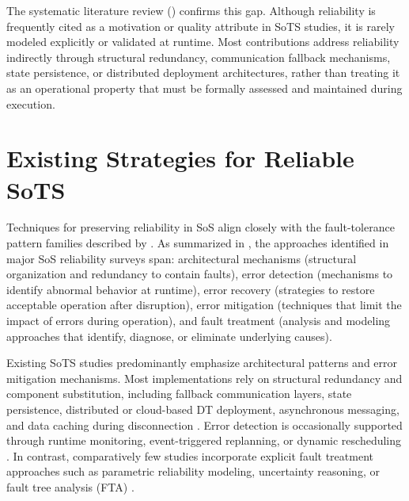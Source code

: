 The systematic literature review () confirms this gap. Although reliability is frequently cited as a motivation or quality attribute in SoTS studies, it is rarely modeled explicitly or validated at runtime. Most contributions address reliability indirectly through structural redundancy, communication fallback mechanisms, state persistence, or distributed deployment architectures, rather than treating it as an operational property that must be formally assessed and maintained during execution.




\section{Existing Strategies for Reliable SoTS}
Techniques for preserving reliability in SoS align closely with the fault-tolerance pattern families described by \citet{hanmer2013patterns}. As summarized in , the approaches identified in major SoS reliability surveys \cite{ferreira2021reliability, uday2015designing, abdelmoumen2026comprehensive} span: architectural mechanisms (structural organization and redundancy to contain faults), error detection (mechanisms to identify abnormal behavior at runtime), error recovery (strategies to restore acceptable operation after disruption), error mitigation (techniques that limit the impact of errors during operation), and fault treatment (analysis and modeling approaches that identify, diagnose, or eliminate underlying causes).

Existing SoTS studies predominantly emphasize architectural patterns and error mitigation mechanisms. Most implementations rely on structural redundancy and component substitution, including fallback communication layers, state persistence, distributed or cloud-based DT deployment, asynchronous messaging, and data caching during disconnection \cite{acharya2023twins, aziz2022empowering, larsen2024towards, lopez2023modeling}. Error detection is occasionally supported through runtime monitoring, event-triggered replanning, or dynamic rescheduling \cite{park2020digital, villalonga2021decision-making}. In contrast, comparatively few studies incorporate explicit fault treatment approaches such as parametric reliability modeling, uncertainty reasoning, or fault tree analysis (FTA) \cite{kutzke2021subsystem, oquendo2019dealing, saraeian2022digital}. 


